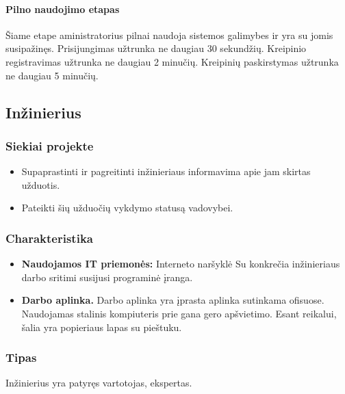 			\setcounter{tocdepth}{5} \setcounter{secnumdepth}{5}
			
			\paragraph{Pilno naudojimo etapas}
			
			Šiame etape aministratorius pilnai naudoja sistemos galimybes ir yra su jomis susipažinęs.
			Prisijungimas užtrunka ne daugiau 30 sekundžių. Kreipinio registravimas užtrunka ne daugiau 2 minučių.
			Kreipinių paskirstymas užtrunka ne daugiau 5 minučių.
			
	\subsection{Inžinierius}
	
		\subsubsection{Siekiai projekte}
	
		\begin{itemize}
			\item Supaprastinti ir pagreitinti inžinieriaus informavima apie jam skirtas užduotis.
			\item Pateikti šių užduočių vykdymo statusą vadovybei.
		\end{itemize}
		
		
		\subsubsection{Charakteristika}
		
		\begin{itemize}
			\item \textbf{Naudojamos IT priemonės:}
				\subitem Interneto naršyklė
				\subitem Su konkrečia inžinieriaus darbo sritimi susijusi programinė įranga.
			\item \textbf{Darbo aplinka.}
			Darbo aplinka yra įprasta aplinka sutinkama ofisuose.
			Naudojamas stalinis kompiuteris prie gana gero apšvietimo.
			Esant reikalui, šalia yra popieriaus lapas su pieštuku.
		\end{itemize}
			
		\subsubsection{Tipas}
		
		Inžinierius yra patyręs vartotojas, ekspertas.		
		

